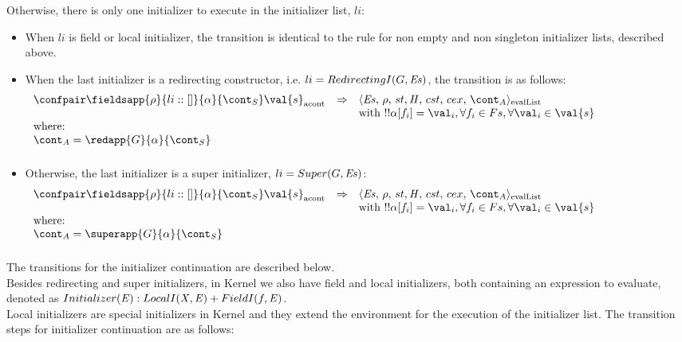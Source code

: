 \documentclass{article}
\begin{document}
\noindent
Otherwise, there is only one initializer to execute in the initializer list, $li$: \\
\begin{itemize}

\item When $li$ is field or local initializer, the transition is identical to the rule for non empty and non singleton initializer lists, described above.\\
\item When the last initializer is a redirecting constructor, i.e. $li = RedirectingI(G, \mathit{E}\mathit{s})$, the transition is as follows:
\[
  \begin{array}{lcl@{\hspace{30mm}}}
	\acontconf{\fieldsapp{\env}{li::[]}{\loc}{\scont}}{\val{s}}
	& \Rightarrow &
	\evallistconf{\exprs}{\env}{\strace}{\cstrace}{\cex}{\acont}\\	
	&&\textrm{with }\deref{\deref{\loc[f_i]}} = \val_{i}, \forall f_i \in Fs, \forall \val_i \in \val{s}\\
	\textrm{where:}\\
	\acont = \redapp{G}{\loc}{\scont}\\[2mm]
  \end{array}
\]

\item Otherwise, the last initializer is a super initializer, $li = Super(G, \mathit{E}\mathit{s})$:
\[
  \begin{array}{lcl@{\hspace{30mm}}}
	\acontconf{\fieldsapp{\env}{li::[]}{\loc}{\scont}}{\val{s}}
	& \Rightarrow &
	\evallistconf{\exprs}{\env}{\strace}{\cstrace}{\cex}{\acont}\\	
	&&\textrm{with }\deref{\deref{\loc[f_i]}} = \val_{i}, \forall f_i \in Fs, \forall \val_i \in \val{s}\\
	\textrm{where:}\\
	\acont = \superapp{G}{\loc}{\scont}\\[2mm]
  \end{array}
\]
\end{itemize}
The transitions for the initializer continuation are described below.\\[2mm]
\noindent
Besides redirecting and super initializers, in Kernel we also have field and local initializers, both containing an expression to evaluate, denoted as $Initializer(\mathit{E}) : LocalI(\mathit{X}, \mathit{E}) + FieldI(f, \mathit{E})$.\\[2mm]
Local initializers are special initializers in Kernel and they extend the environment for the execution of the initializer list. The transition steps for initializer continuation are as follows:
\end{document}
